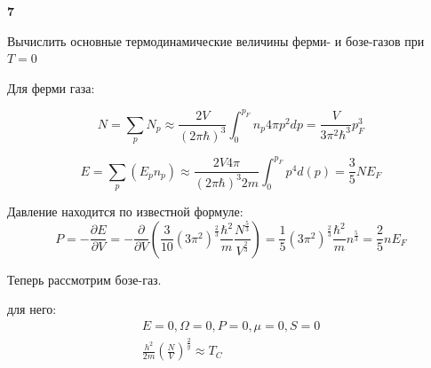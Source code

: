 \documentclass[a4paper,12pt]{article} %
\newcommand{\parder}[2]{\frac{\partial {#1}}{\partial {#2}}}
\begin{document}
\begin{task}\textbf{7}

Вычислить основные термодинамические величины ферми- и бозе-газов при $T=0$


Для ферми газа:

\[	N=\sum_{p}N_{p} \approx \frac{2 V}{(2 \pi \hbar)^{3}} \int_{0}^{p_{F}} n_{p} 4 \pi p^{2} dp=\frac{V}{3 \pi^{2} \hbar^{3}} p_{F}^{3} \]

\[ 
E=\sum_{p}\left(E_{p} n_{p}\right) \approx \frac{2 V 4 \pi}{(2 \pi \hbar)^{3} 2 m} \int_{0}^{p_{F}} p^{4} d(p)=\frac{3}{5} N E_{F}  \]

Давление находится по известной формуле:
\[ 	P=-\parder{E}{V}=
-\frac{\partial}{\partial V}\left(\frac{3}{10}\left(3 \pi^{2}\right)^{\frac{2}{3}} \frac{\hbar^{2}}{m} \frac{N^{\frac{5}{3}}}{V^{\frac{2}{3}}}\right)=
\frac{1}{5}\left(3 \pi^{2}\right)^{\frac{2}{3}} \frac{\hbar^{2}}{m} n^{\frac{5}{3}}=
\frac{2}{5} n E_{F} \]







Теперь рассмотрим бозе-газ.


для него:
$$
\begin{array}{c}
	E=0, \Omega=0, P=0, \mu=0, S=0 \\
	\frac{h^{2}}{2 m}\left(\frac{N}{V}\right)^{\frac{2}{y}} \approx T_{C}
\end{array}
$$











\end{task}
\end{document}
